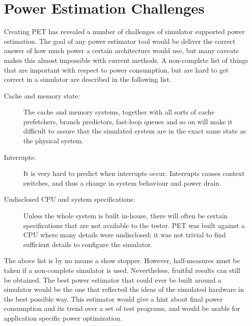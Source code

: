 \section{Power Estimation Challenges}

Creating PET has revealed a number of challenges of simulator supported power
estimation. The goal of any power estimator tool would be deliver the correct
answer of how much power a certain architecture would use, but many caveats
makes this almost impossible with current methods. A non-complete list of things
that are important with respect to power consumption, but are hard to get
correct in a simulator are described in the following list.

\begin{description}
    \item[Cache and memory state:]
        The cache and memory systems, together with all sorts of cache
        prefetchers, branch predictors, fast-loop queues and so on will make it
        difficult to assure that the simulated system are in the exact same
        state as the physical system.
    \item[Interrupts:]
        It is very hard to predict when interrupts occur. Interrupts causes
        context switches, and thus a change in system behaviour and power drain.
    \item[Undisclosed CPU and system specifications:]
        Unless the whole system is built in-house, there will often be certain
        specifications that are not available to the tester. PET was built
        against a CPU where many details were undisclosed; it was not trivial to
        find sufficient details to configure the simulator.
\end{description}

The above list is by no means a show stopper. However, half-measures must be
taken if a non-complete simulator is used. Nevertheless, fruitful results can
still be obtained. The best power estimator that could ever be built around a
simulator would be the one that reflected the ideas of the simulated hardware in
the best possible way. This estimator would give a hint about final power
consumption and its trend over a set of test programs, and would be usable for
application specific power optimization.
